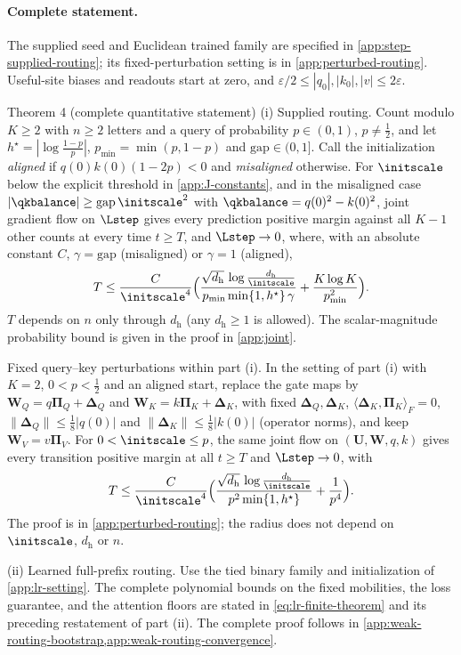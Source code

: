\paragraph{Complete statement.}\label{app:J-full-statement}
The supplied seed and Euclidean trained family are specified in
\cref{app:step-supplied-routing}; its fixed-perturbation setting is in
\cref{app:perturbed-routing}. Useful-site biases and readouts start at zero,
and $\varepsilon/2\le|q_0|,|k_0|,|v|\le2\varepsilon$.
\begin{restated}{Theorem 4 (complete quantitative statement)}
\textnormal{(i) Supplied routing.} Count modulo $K\ge2$ with $n\ge2$ letters and a query of probability $p\in(0,1)$, $p\neq\tfrac{1}{2}$, and let $h^\star=|\log\tfrac{1-p}{p}|$,
$p_{\min}=\min(p,1-p)$ and $\mathrm{gap}\in(0,1]$. Call the initialization \emph{aligned} if $q(0)k(0)(1-2p)<0$ and \emph{misaligned} otherwise.
For $\initscale$ below the explicit threshold in \cref{app:J-constants}, and in the misaligned case
$|\qkbalance|\ge\mathrm{gap}\,\initscale^2$ with $\qkbalance=q(0)^2-k(0)^2$, joint gradient flow on $\Lstep$ gives
every prediction positive margin against all $K-1$ other counts at every time $t\ge T$, and $\Lstep\to0$, where, with an absolute constant $C$,
$\gamma=\mathrm{gap}$ (misaligned) or $\gamma=1$ (aligned),
\[
 T\le\frac{C}{\initscale^4}\Bigl(\frac{\sqrt{d_{\mathrm h}}\,\log\frac{d_{\mathrm h}}{\initscale}}{p_{\min}\min\{1,h^\star\}\,\gamma}+\frac{K\log K}{p_{\min}^2}\Bigr).
\]
$T$ depends on $n$ only through $d_{\mathrm h}$ (any $d_{\mathrm h}\ge1$ is allowed).
The scalar-magnitude probability bound is given in the proof in \cref{app:joint}.

\textnormal{Fixed query--key perturbations within part (i).} In the setting of part (i) with $K=2$, $0<p<\tfrac12$ and an aligned start, replace the
gate maps by $\mathbf W_Q=q\bm\Pi_Q+\bm\Delta_Q$ and $\mathbf W_K=k\bm\Pi_K+\bm\Delta_K$, with fixed $\bm\Delta_Q,\bm\Delta_K$,
$\langle\bm\Delta_K,\bm\Pi_K\rangle_F=0$, $\|\bm\Delta_Q\|\le\tfrac18|q(0)|$ and $\|\bm\Delta_K\|\le\tfrac18|k(0)|$ (operator norms), and keep
$\mathbf W_V=v\bm\Pi_V$. For $0<\initscale\le p$, the same joint flow on $(\mathbf U,\mathbf W,q,k)$ gives every transition positive margin at all
$t\ge T$ and $\Lstep\to0$, with
\[
 T\le\frac{C}{\initscale^4}\Bigl(\frac{\sqrt{d_{\mathrm h}}\,\log\frac{d_{\mathrm h}}{\initscale}}{p^2\min\{1,h^\star\}}+\frac1{p^4}\Bigr).
\]
The proof is in \cref{app:perturbed-routing}; the radius does not depend on $\initscale$, $d_{\mathrm h}$ or $n$.

\textnormal{(ii) Learned full-prefix routing.} Use the tied binary family and
initialization of \cref{app:lr-setting}. The complete polynomial bounds on the
fixed mobilities, the loss guarantee, and the attention floors are stated in
\cref{eq:lr-finite-theorem} and its preceding restatement of part (ii).
The complete proof follows in \cref{app:weak-routing-bootstrap,app:weak-routing-convergence}.
\end{restated}
